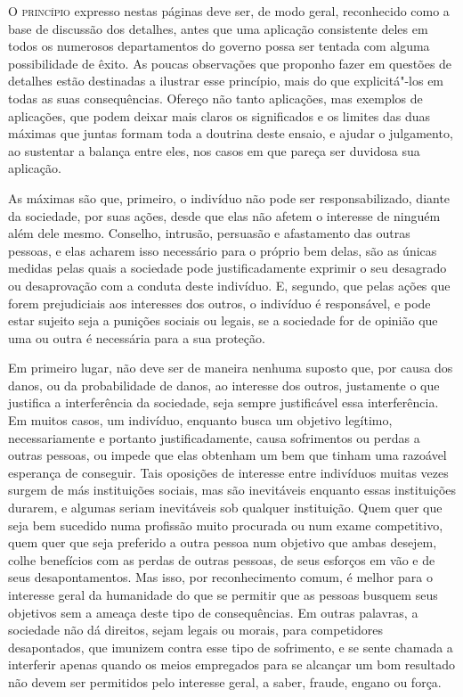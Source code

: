 \textsc{O princípio} expresso nestas páginas deve ser, de modo geral, reconhecido
como a base de discussão dos detalhes, antes que uma aplicação
consistente deles em todos os numerosos departamentos do governo possa
ser tentada com alguma possibilidade de êxito. As poucas observações
que proponho fazer em questões de detalhes estão destinadas a ilustrar
esse princípio, mais do que explicitá"-los em todas as suas
consequências. Ofereço não tanto aplicações, mas exemplos de
aplicações, que podem deixar mais claros os significados e os limites
das duas máximas que juntas formam toda a doutrina deste ensaio, e
ajudar o julgamento, ao sustentar a balança entre eles, nos casos em
que pareça ser duvidosa sua aplicação.

As máximas são que, primeiro, o indivíduo não pode ser responsabilizado,
diante da sociedade, por suas ações, desde que elas não afetem o
interesse de ninguém além dele mesmo. Conselho, intrusão, persuasão e
afastamento das outras pessoas, e elas acharem isso necessário para o
próprio bem delas, são as únicas medidas pelas quais a sociedade pode
justificadamente exprimir o seu desagrado ou desaprovação com a conduta
deste indivíduo. E, segundo, que pelas ações que forem prejudiciais aos
interesses dos outros, o indivíduo é responsável, e pode estar sujeito
seja a punições sociais ou legais, se a sociedade for de opinião que
uma ou outra é necessária para a sua proteção.

Em primeiro lugar, não deve ser de maneira nenhuma suposto que, por
causa dos danos, ou da probabilidade de danos, ao interesse dos outros,
justamente o que justifica a interferência da sociedade, seja
sempre justificável essa interferência. Em muitos casos, um
indivíduo, enquanto busca um objetivo legítimo, necessariamente e
portanto justificadamente, causa sofrimentos ou perdas a outras
pessoas, ou impede que elas obtenham um bem que tinham uma
razoável esperança de conseguir. Tais oposições de interesse entre
indivíduos muitas vezes surgem de más instituições sociais, mas são
inevitáveis enquanto essas instituições durarem, e algumas seriam
inevitáveis sob qualquer instituição. Quem quer que seja bem sucedido
numa profissão muito procurada ou num exame competitivo, quem quer que
seja preferido a outra pessoa num objetivo que ambas desejem,
colhe benefícios com as perdas de outras pessoas, de seus esforços em
vão e de seus desapontamentos. Mas isso, por reconhecimento comum, é
melhor para o interesse geral da humanidade do que se permitir que as
pessoas busquem seus objetivos sem a ameaça deste tipo de
consequências. Em outras palavras, a sociedade não dá direitos, sejam
legais ou morais, para competidores desapontados, que imunizem contra
esse tipo de sofrimento, e se sente chamada a interferir apenas quando
os meios empregados para se alcançar um bom resultado não devem ser
permitidos pelo interesse geral, a saber, fraude, engano ou força. 


